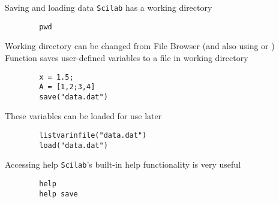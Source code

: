 \documentclass[%
    10pt,
    xcolor={dvipsnames},
    compress, %
]{beamer}
\newcommand{\scilab}{\texttt{Scilab}}
\begin{document}
\begin{frame}[fragile]{Saving and loading data}
    \scilab{} has a working directory
    \begin{lstlisting}
        pwd
    \end{lstlisting}
    Working directory can be changed from File Browser (and also using  or )\\[0.5em]
    Function  saves user-defined variables to a file in working directory
    \begin{lstlisting}
        x = 1.5;
        A = [1,2;3,4]
        save("data.dat")
    \end{lstlisting}
    These variables can be loaded for use later
    \begin{lstlisting}
        listvarinfile("data.dat")
        load("data.dat")
    \end{lstlisting}
\end{frame}

\begin{frame}[fragile]{Accessing help}
    \scilab's built-in help functionality is very useful
    \begin{lstlisting}
        help
        help save
    \end{lstlisting}
\end{frame}
\end{document}
